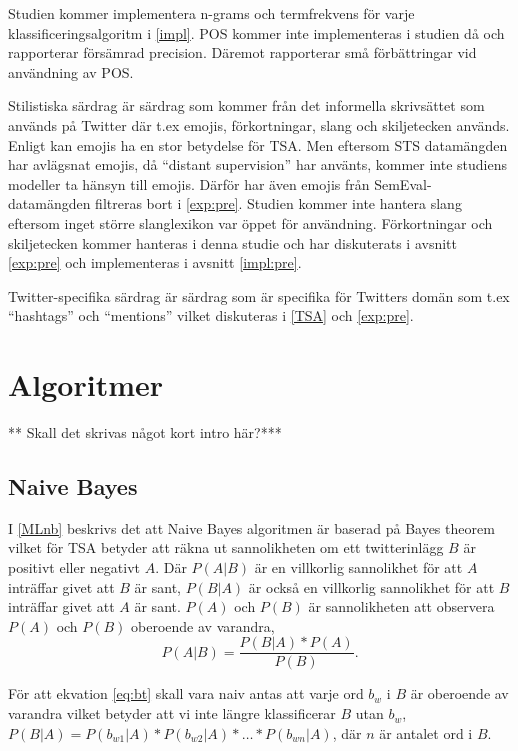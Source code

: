 \documentclass{kaumasters} %
\begin{document}
Studien kommer implementera n-grams och termfrekvens för varje klassificeringsalgoritm i \ref{impl}. POS kommer inte implementeras i studien då \cite{go2009twitter} och \cite{feature:001} rapporterar försämrad precision. Däremot rapporterar \cite{feature:002} små förbättringar vid användning av POS.

Stilistiska särdrag är särdrag som kommer från det informella skrivsättet som används på Twitter där t.ex emojis, förkortningar, slang och skiljetecken används. Enligt \cite{feature:002} kan emojis ha en stor betydelse för TSA. Men eftersom STS datamängden har avlägsnat emojis, då “distant supervision” \cite{sts:001} har använts, kommer inte studiens modeller ta hänsyn till emojis. Därför har även emojis från SemEval-datamängden filtreras bort i \ref{exp:pre}. Studien kommer inte hantera slang eftersom inget större slanglexikon var öppet för användning. 
Förkortningar och skiljetecken kommer hanteras i denna studie och har diskuterats i avsnitt \ref{exp:pre} och implementeras i avsnitt \ref{impl:pre}.

Twitter-specifika särdrag är särdrag som är specifika för Twitters domän som t.ex “hashtags” och “mentions” vilket diskuteras i \ref{TSA} och \ref{exp:pre}.




\section{Algoritmer}
** Skall det skrivas något kort intro här?***
\subsection{Naive Bayes}
I \ref{MLnb} beskrivs det att Naive Bayes algoritmen är baserad på Bayes theorem  \cite{wiki:009} vilket för TSA betyder att räkna ut sannolikheten om ett twitterinlägg $B$ är positivt eller negativt $A$. Där $P(A | B)$ är en villkorlig sannolikhet för att $A$ inträffar givet att $B$ är sant, $P(B | A)$ är också en villkorlig sannolikhet för att $B$ inträffar givet att $A$ är sant. $P(A)$ och $P(B)$ är sannolikheten att observera $P(A)$ och $P(B)$ oberoende av varandra,
\begin{equation}\label{eq:bt}
P(A|B) = \frac{P(B|A) * P(A)}{P(B)}.
\end{equation}

För att ekvation \ref{eq:bt} skall vara naiv antas att varje ord $b_w$ i $B$ är oberoende av varandra vilket betyder att vi inte längre klassificerar $B$ utan $b_w$, $P(B|A) = P(b_{w1}|A) * P(b_{w2}|A) * … * P(b_{wn}|A)$, där $n$ är antalet ord i $B$.
\end{document}

